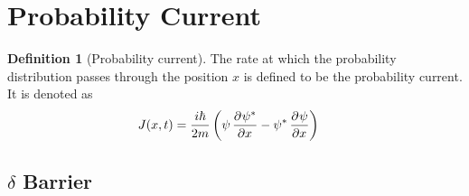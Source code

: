 \documentclass[titlepage, fleqn, a4paper, 12pt, twoside]{article}
\theoremstyle{definition}
\newtheorem{definition}{Definition}
\theoremstyle{theorem}
\begin{document}
\section{Probability Current}

\begin{definition}[Probability current]
	The rate at which the probability distribution passes through the position $x$ is defined to be the probability current.
	It is denoted as
	\begin{align*}
		J(x,t) &= \frac{i \hbar}{2 m} \left( \psi \dpd{\psi^*}{x} - \psi^* \dpd{\psi}{x} \right)
	\end{align*}
\end{definition}

\subsection{$\delta$ Barrier}
\end{document}
